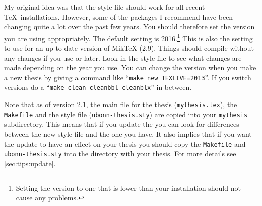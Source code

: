 My original idea was that the style file should work for all recent
\TeX\ installations.  However, some of the packages I recommend have
been changing quite a lot over the past few years.
You should therefore set the \TeXLive version you are using appropriately.
The default setting is 2016.\footnote{%
Setting the \TeXLive version to one that is lower than your installation should not cause any problems.}
This is also the setting to use for an up-to-date version of MikTeX (2.9).
Things should compile without any changes if you use  or later.
Look in the style file to see what changes are made depending on the year you use.
You can change the \TeXLive version when you make a new thesis
by giving a command like \enquote{\texttt{make new TEXLIVE=2013}}. %
If you switch \TeXLive versions do a
\enquote{\texttt{make clean cleanbbl cleanblx}} in between.

Note that as of version 2.1, the main file for the thesis
(\texttt{mythesis.tex}), the \texttt{Makefile} and the style file
(\texttt{ubonn-thesis.sty}) are copied into your \texttt{mythesis}
subdirectory. This means that if you update the 
you can look for differences between the new style file and the one
you have. It also implies that if you want the update to have an
effect on your thesis you should copy the \texttt{Makefile} and
\texttt{ubonn-thesis.sty} into the directory with your thesis.
For more details see \cref{sec:tips:update}.

